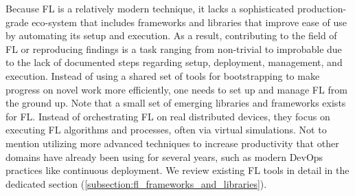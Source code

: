 Because FL is a relatively modern technique,
it lacks a sophisticated production-grade eco-system that includes
frameworks and libraries that improve ease of use by automating its setup and execution.
As a result, contributing to the field of FL or reproducing findings is a task
ranging from non-trivial to improbable due to the lack of documented steps regarding setup,
deployment, management, and execution.
Instead of using a shared set of tools for bootstrapping to make progress on novel work more efficiently,
one needs to set up and manage FL from the ground up.
Note that a small set of emerging libraries and frameworks exists for FL.
Instead of orchestrating FL on real distributed devices,
they focus on executing FL algorithms and processes, often via virtual simulations. 
Not to mention utilizing more advanced techniques to increase productivity that
other domains have already been using for several years, such as modern DevOps practices like continuous deployment.
We review existing FL tools in detail in the dedicated section (\ref{subsection:fl_frameworks_and_libraries}).